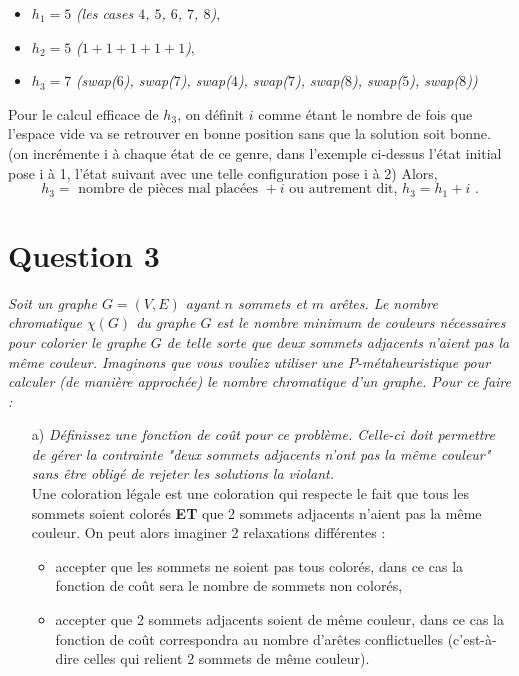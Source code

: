 \documentclass{article}
\newcommand{\term}[1]{\textit{\textcolor{maintitle}{#1}}}
\begin{document}
\begin{sffamily}
\begin{itemize}
\item $h_1 = 5$ \textit{(les cases $4$, $5$, $6$, $7$, $8$)},
\item $h_2 = 5$ \textit{($1+1+1+1+1$)},
\item $h_3 = 7$ \textit{(swap($6$), swap($7$), swap($4$), swap($7$), swap($8$), swap($5$), swap($8$))} \\
\end{itemize}

Pour le calcul efficace de $h_3$, on définit $i$ comme étant le nombre de fois que l'espace vide va se retrouver en bonne 
position sans que la solution soit bonne. (on incrémente i à chaque état de ce genre, dans l'exemple ci-dessus l'état initial 
pose i à 1, l'état suivant avec une telle configuration pose i à 2) Alors,
$$h_3 = \text{ nombre de pièces mal placées }+ i \text{ ou autrement dit, } h_3 = h_1+i \text{ .}$$
\section{Question 3}

\term{Soit un graphe $G = (V, E)$ ayant $n$ sommets et $m$ arêtes. Le nombre chromatique $\chi(G)$ du graphe $G$ est le nombre 
minimum de couleurs nécessaires pour colorier le graphe $G$ de telle sorte que deux sommets adjacents n’aient pas la même 
couleur. Imaginons que vous vouliez utiliser une $P$-métaheuristique pour calculer (de manière approchée) le nombre chromatique 
d’un graphe. Pour ce faire :}
\begin{enumerate}
\item[a)] \term{Définissez une fonction de coût pour ce problème. Celle-ci doit permettre de gérer la contrainte "deux sommets 
adjacents n’ont pas la même couleur" sans être obligé de rejeter les solutions la violant.}\\

Une coloration légale est une coloration qui respecte le fait que tous les sommets soient colorés \textbf{ET} que 2 sommets 
adjacents n'aient pas la même couleur. On peut alors imaginer 2 relaxations différentes :
\begin{itemize}
\item accepter que les sommets ne soient pas tous colorés, dans ce cas la fonction de coût sera le nombre de sommets non colorés,
\item accepter que 2 sommets adjacents soient de même couleur, dans ce cas la fonction de coût correspondra au nombre d'arêtes 
conflictuelles (c'est-à-dire celles qui relient 2 sommets de même couleur).
\end{itemize}


\end{enumerate}
\end{sffamily}
\end{document}
